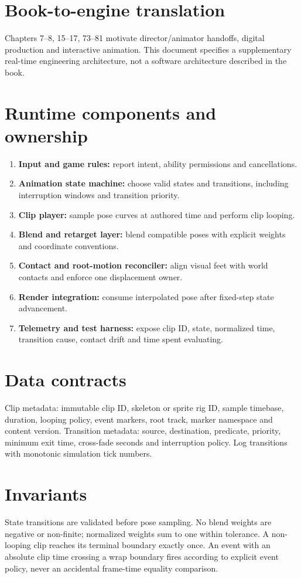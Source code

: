 \documentclass[10pt,letterpaper]{article}
\begin{document}
\makedoctitle
\makedocsummary
\tableofcontents\clearpage

\section{Book-to-engine translation}
Chapters 7--8, 15--17, 73--81 motivate director/animator handoffs, digital production and interactive animation. This document specifies a supplementary real-time engineering architecture, not a software architecture described in the book.
\section{Runtime components and ownership}
\begin{enumerate}
\item \textbf{Input and game rules:} report intent, ability permissions and cancellations.
\item \textbf{Animation state machine:} choose valid states and transitions, including interruption windows and transition priority.
\item \textbf{Clip player:} sample pose curves at authored time and perform clip looping.
\item \textbf{Blend and retarget layer:} blend compatible poses with explicit weights and coordinate conventions.
\item \textbf{Contact and root-motion reconciler:} align visual feet with world contacts and enforce one displacement owner.
\item \textbf{Render integration:} consume interpolated pose after fixed-step state advancement.
\item \textbf{Telemetry and test harness:} expose clip ID, state, normalized time, transition cause, contact drift and time spent evaluating.
\end{enumerate}
\section{Data contracts}
Clip metadata: immutable clip ID, skeleton or sprite rig ID, sample timebase, duration, looping policy, event markers, root track, marker namespace and content version. Transition metadata: source, destination, predicate, priority, minimum exit time, cross-fade seconds and interruption policy. Log transitions with monotonic simulation tick numbers.
\section{Invariants}
State transitions are validated before pose sampling. No blend weights are negative or non-finite; normalized weights sum to one within tolerance. A non-looping clip reaches its terminal boundary exactly once. An event with an absolute clip time crossing a wrap boundary fires according to explicit event policy, never an accidental frame-time equality comparison.
\end{document}
